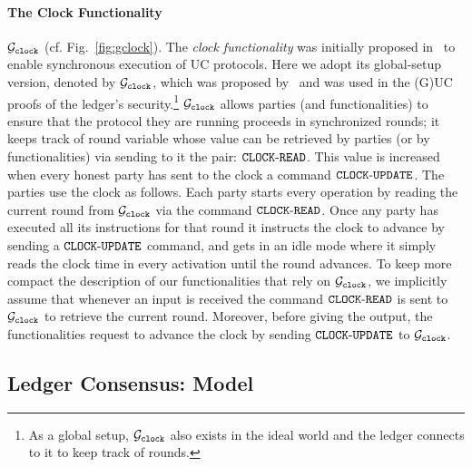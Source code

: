 \paragraph{The Clock Functionality} $\mathcal{G}_{\mathtt{clock}}$ (cf. Fig.~\ref{fig:gclock}).
The \emph{clock functionality}  was initially proposed in~\cite{TCC:KMTZ13} to enable synchronous execution of UC protocols. Here we adopt its global-setup version, denoted by $\mathcal{G}_{\mathtt{clock}}$, which was proposed by~\cite{C:BMTZ17} and was used in the (G)UC proofs of the ledger's security.\footnote{As a global setup, $\mathcal{G}_{\mathtt{clock}}$ also exists in the ideal world and the ledger connects to it to keep track of rounds.}  $\mathcal{G}_{\mathtt{clock}}$  allows  parties (and functionalities) to ensure that the protocol they are running proceeds in synchronized rounds; it keeps track of  round variable whose value can be retrieved by parties (or by functionalities) via sending to it the pair: $\mathtt{CLOCK\text{-}READ}$. This value is increased when every honest party has sent to the clock a command $\mathtt{CLOCK\text{-}UPDATE}$.
The parties use the clock as follows.  Each party starts every operation by reading the current round from $\mathcal{G}_{\mathtt{clock}}$ via the command $\mathtt{CLOCK\text{-}READ}$. Once any party  has executed all its instructions
for that round it instructs the clock to advance by sending a $\mathtt{CLOCK\text{-}UPDATE}$ command, and gets in an idle mode where it simply reads the clock time in every activation until the round advances. 
To keep more compact the description of our functionalities that rely on $\mathcal{G}_{\mathtt{clock}}$, we implicitly assume that
whenever an input is received the command $\mathtt{CLOCK\text{-}READ}$ is sent to $\mathcal{G}_{\mathtt{clock}}$ to retrieve the current round. Moreover, before giving the output, the functionalities request to advance the clock by sending $\mathtt{CLOCK\text{-}UPDATE}$ to $\mathcal{G}_{\mathtt{clock}}$.






\subsection{Ledger Consensus: Model}\label{se:ledgermodel}

